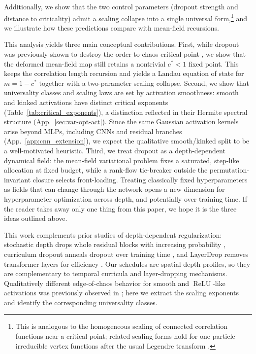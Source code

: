 \documentclass{article}
\DeclareMathOperator{\ReLU}{ReLU}
\newcommand{\relu}{\ensuremath{\ReLU}}
\theoremstyle{plain}
\theoremstyle{definition}
\theoremstyle{remark}
\begin{document}
Additionally, we show that the two control parameters (dropout strength and distance to criticality) admit a scaling collapse into a single universal form,\footnote{This is analogous to the homogeneous scaling of connected correlation functions near a critical point; related scaling forms hold for one-particle-irreducible vertex functions after the usual Legendre transform \cite{ZinnJustin2002QFTCritical}.} and we illustrate how these predictions compare with mean-field recursions. 

This analysis yields three main conceptual contributions. First, while dropout was previously shown to destroy the order-to-chaos critical point \cite{schoenholz2017deepinformationpropagation}, we show that the deformed mean-field map still retains a nontrivial $c^\ast<1$ fixed point. This keeps the correlation length recursion and yields a Landau equation of state for $m=1-c^\ast$ together with a two-parameter scaling collapse. Second, we show that universality classes and scaling laws are set by activation smoothness: smooth and kinked activations have distinct critical exponents (Table~\ref{tab:critical_exponents}), a distinction reflected in their Hermite spectral structure (App.~\ref{sec:var-opt-act}). Since the same Gaussian activation kernels arise beyond MLPs, including CNNs and residual branches (App.~\ref{app:cnn_extension}), we expect the qualitative smooth/kinked split to be a well-motivated heuristic. Third, we treat dropout as a depth-dependent dynamical field: the mean-field variational problem fixes a saturated, step-like allocation at fixed budget, while a rank-flow tie-breaker outside the permutation-invariant closure selects front-loading. Treating classically fixed hyperparameters as fields that can change through the network opens a new dimension for hyperparameter optimization across depth, and potentially over training time. If the reader takes away only one thing from this paper, we hope it is the three ideas outlined above.

This work complements prior studies of depth-dependent regularization: stochastic depth drops whole residual blocks with increasing probability \cite{huang2016deep}, curriculum dropout anneals dropout over training time \cite{morerio2017curriculum}, and LayerDrop removes transformer layers for efficiency \cite{fan2019reducing}. Our schedules are spatial depth profiles, so they are complementary to temporal curricula and layer-dropping mechanisms. Qualitatively different edge-of-chaos behavior for smooth and \relu{}-like activations was previously observed in \cite{hayou2019impact}; here we extract the scaling exponents and identify the corresponding universality classes.
\end{document}
